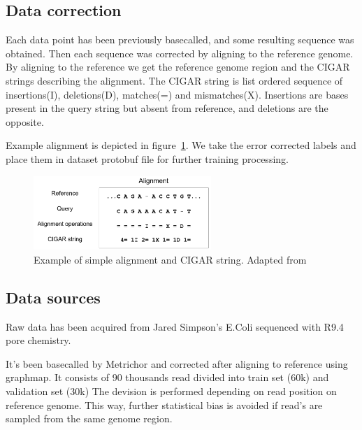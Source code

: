 \documentclass[times, utf8, diplomski, english]{fer}
\begin{document}
\subsection{Data correction}
Each data point has been previously basecalled, and some resulting sequence was obtained. Then each sequence was corrected by aligning to the reference genome. By aligning to the reference we get the reference genome region and the CIGAR strings describing the alignment. The CIGAR string is list ordered sequence of insertions(I), deletions(D), matches(=) and mismatches(X). Insertions are bases present in the query string but absent from reference, and deletions are the opposite. 

Example alignment is depicted in figure~\ref{fg:align}. We take the error corrected labels and place them in dataset protobuf file for further training processing.

\begin{figure}
    \begin{center}
        \includegraphics[width=0.6\textwidth]{alignment}
        \caption{Example of simple alignment and CIGAR string. Adapted from~\citep{mratkovic}}
        \label{fg:align}
    \end{center}
\end{figure} 

\subsection{Data sources}

Raw data has been acquired from Jared Simpson's E.Coli sequenced with R9.4 pore chemistry. 

It's been basecalled by Metrichor and corrected after aligning to reference using graphmap. 
It consists of 90 thousands read divided into train set (60k) and validation set (30k)
The devision is performed depending on read position on reference genome. 
This way, further statistical bias is avoided if read's are sampled from the same genome region.

\end{document}

